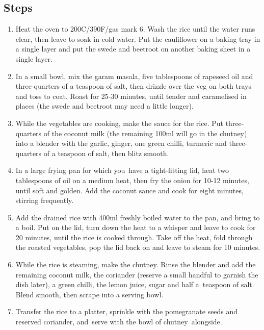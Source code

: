 \documentclass{book}
\begin{document}
\subsection*{Steps}
\begin{enumerate}
\item Heat the oven to 200C/390F/gas mark 6. Wash the rice until the water runs clear, then leave to soak in cold water. Put the cauliflower on a baking tray in a single layer and put the swede and beetroot on another baking sheet in a single layer.
\item In a small bowl, mix the garam masala, five tablespoons of rapeseed oil and three-quarters of a teaspoon of salt, then drizzle over the veg on both trays and toss to coat. Roast for 25-30 minutes, until tender and caramelised in places (the swede and beetroot may need a little longer).
\item While the vegetables are cooking, make the sauce for the rice. Put three-quarters of the coconut milk (the remaining 100ml will go in the chutney) into a blender with the garlic, ginger, one green chilli, turmeric and three-quarters of a teaspoon of salt, then blitz smooth.
\item In a large frying pan for which you have a tight-fitting lid, heat two tablespoons of oil on a medium heat, then fry the onion for 10-12 minutes, until soft and golden. Add the coconut sauce and cook for eight minutes, stirring frequently.
\item Add the drained rice with 400ml freshly boiled water to the pan, and bring to a boil. Put on the lid, turn down the heat to a whisper and leave to cook for 20 minutes, until the rice is cooked through. Take off the heat, fold through the roasted vegetables, pop the lid back on and leave to steam for 10 minutes.
\item While the rice is steaming, make the chutney. Rinse the blender and add the remaining coconut milk, the coriander (reserve a small handful to garnish the dish later), a green chilli, the lemon juice, sugar and half a teaspoon of salt. Blend smooth, then scrape into a serving bowl.
\item Transfer the rice to a platter, sprinkle with the pomegranate seeds and reserved coriander, and serve with the bowl of chutney alongside.
\end{enumerate}
\newpage
\end{document}
